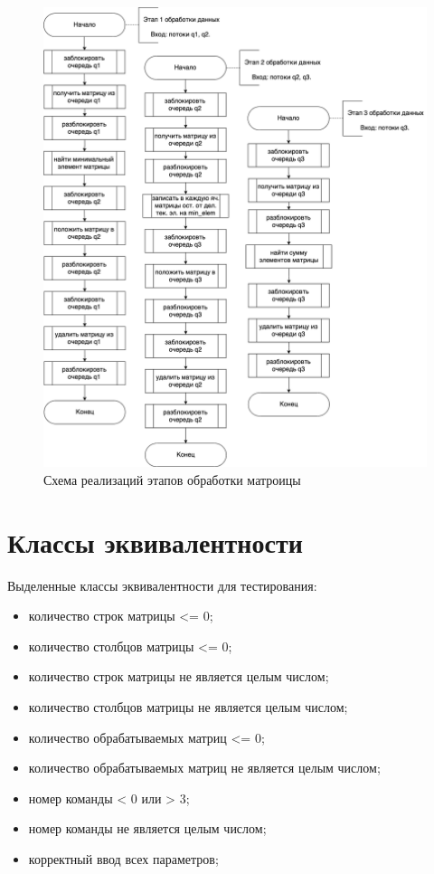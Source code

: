 \begin{figure}[h]
	\centering
	\includegraphics[scale=0.5]{img/stages.png}
	\caption{Схема реализаций этапов обработки матроицы}
	\label{fig:stages}
\end{figure} 

\clearpage

\section{Классы эквивалентности}

Выделенные классы эквивалентности для тестирования:

\begin{itemize}
	\item количество строк матрицы <= 0;
	\item количество столбцов матрицы <= 0;
	\item количество строк матрицы не является целым числом;
	\item количество столбцов матрицы не является целым числом;
	\item количество обрабатываемых матриц <= 0;
	\item количество обрабатываемых матриц не является целым числом;
	\item номер команды < 0 или > 3;
	\item номер команды не является целым числом;
	\item корректный ввод всех параметров;
\end{itemize}

